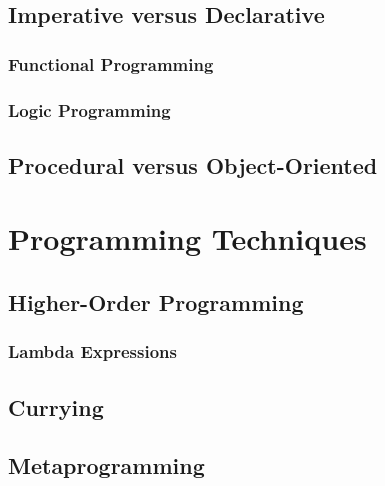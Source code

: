 
\subsection{Imperative versus Declarative}

\subsubsection{Functional Programming}

\subsubsection{Logic Programming}


\subsection{Procedural versus Object-Oriented}


\toclineskip
\section{Programming Techniques}

\subsection{Higher-Order Programming}

\subsubsection{Lambda Expressions}

\subsection{Currying}

\subsection{Metaprogramming}

